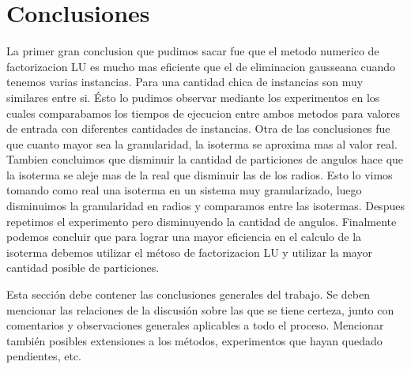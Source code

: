 \section{Conclusiones}

La primer gran conclusion que pudimos sacar fue que el metodo numerico de factorizacion LU es mucho mas eficiente que el de eliminacion gausseana cuando tenemos varias instancias. Para una cantidad chica de instancias son muy similares entre si. Ésto lo pudimos observar mediante los experimentos en los cuales comparabamos los tiempos de ejecucion entre ambos metodos para valores de entrada con diferentes cantidades de instancias. 
Otra de las conclusiones fue que cuanto mayor sea la granularidad, la isoterma se aproxima mas al valor real. Tambien concluimos que disminuir la cantidad de particiones de angulos hace que la isoterma se aleje mas de la real que disminuir las de los radios. Esto lo vimos tomando como real una isoterma en un sistema muy granularizado, luego disminuimos la granularidad en radios y comparamos entre las isotermas. Despues repetimos el experimento pero disminuyendo la cantidad de angulos.
Finalmente podemos concluir que para lograr una mayor eficiencia en el calculo de la isoterma debemos utilizar el métoso de factorizacion LU y utilizar la mayor cantidad posible de particiones.

  

  {\color{Gray} Esta sección debe contener las conclusiones generales del trabajo. Se deben mencionar las relaciones de la discusión sobre las que se tiene certeza, junto con comentarios y observaciones generales aplicables a todo el proceso. Mencionar también posibles extensiones a los métodos, experimentos que hayan quedado pendientes, etc.}

